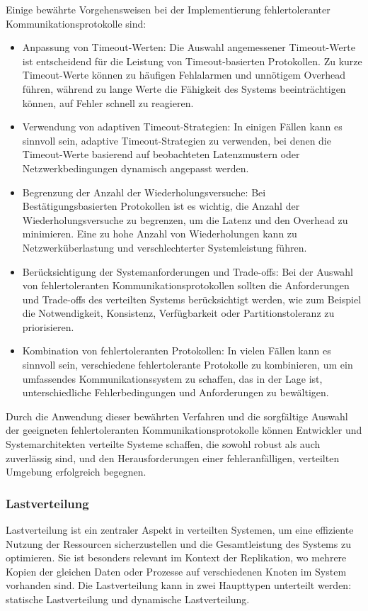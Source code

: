 \documentclass[../vs-script-first-v01.tex]{subfiles}
\begin{document}
Einige bewährte Vorgehensweisen bei der Implementierung fehlertoleranter Kommunikationsprotokolle sind:
\begin{itemize}
\item Anpassung von Timeout-Werten: Die Auswahl angemessener Timeout-Werte ist entscheidend für die Leistung von Timeout-basierten Protokollen. Zu kurze Timeout-Werte können zu häufigen Fehlalarmen und unnötigem Overhead führen, während zu lange Werte die Fähigkeit des Systems beeinträchtigen können, auf Fehler schnell zu reagieren.
\item Verwendung von adaptiven Timeout-Strategien: In einigen Fällen kann es sinnvoll sein, adaptive Timeout-Strategien zu verwenden, bei denen die Timeout-Werte basierend auf beobachteten Latenzmustern oder Netzwerkbedingungen dynamisch angepasst werden.
\item Begrenzung der Anzahl der Wiederholungsversuche: Bei Bestätigungsbasierten Protokollen ist es wichtig, die Anzahl der Wiederholungsversuche zu begrenzen, um die Latenz und den Overhead zu minimieren. Eine zu hohe Anzahl von Wiederholungen kann zu Netzwerküberlastung und verschlechterter Systemleistung führen.
\item Berücksichtigung der Systemanforderungen und Trade-offs: Bei der Auswahl von fehlertoleranten Kommunikationsprotokollen sollten die Anforderungen und Trade-offs des verteilten Systems berücksichtigt werden, wie zum Beispiel die Notwendigkeit, Konsistenz, Verfügbarkeit oder Partitionstoleranz zu priorisieren.
\item Kombination von fehlertoleranten Protokollen: In vielen Fällen kann es sinnvoll sein, verschiedene fehlertolerante Protokolle zu kombinieren, um ein umfassendes Kommunikationssystem zu schaffen, das in der Lage ist, unterschiedliche Fehlerbedingungen und Anforderungen zu bewältigen.
\end{itemize}
Durch die Anwendung dieser bewährten Verfahren und die sorgfältige Auswahl der geeigneten fehlertoleranten Kommunikationsprotokolle können Entwickler und Systemarchitekten verteilte Systeme schaffen, die sowohl robust als auch zuverlässig sind, und den Herausforderungen einer fehleranfälligen, verteilten Umgebung erfolgreich begegnen.


\subsubsection{Lastverteilung}
Lastverteilung ist ein zentraler Aspekt in verteilten Systemen, um eine effiziente Nutzung der Ressourcen sicherzustellen und die Gesamtleistung des Systems zu optimieren. Sie ist besonders relevant im Kontext der Replikation, wo mehrere Kopien der gleichen Daten oder Prozesse auf verschiedenen Knoten im System vorhanden sind. Die Lastverteilung kann in zwei Haupttypen unterteilt werden: statische Lastverteilung und dynamische Lastverteilung.
\end{document}
